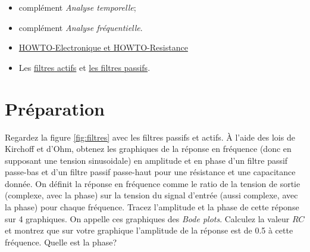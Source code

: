 \documentclass[canadien,12pt,oneside,letterpaper]{article}
\begin{document}
\begin{itemize}
\item complément \textit{Analyse temporelle};
\item complément \textit{Analyse fréquentielle}.
\item \href{https://github.com/dccote/Enseignement/blob/master/HOWTO/}{HOWTO-Electronique et HOWTO-Resistance} 
\item Les \href{https://www.electronics-tutorials.ws/filter/filter_5.html}{filtres actifs} et \href{https://www.electronics-tutorials.ws/filter/filter_6.html}{les filtres passifs}.
\end{itemize}





\section{Préparation}
Regardez la figure \ref{fig:filtres} avec les filtres passifs et actifs. À l'aide des lois de Kirchoff et d'Ohm, obtenez les graphiques de la réponse en fréquence (donc en supposant une tension sinusoidale) en amplitude et en phase d'un filtre passif passe-bas et d'un filtre passif passe-haut pour une résistance et une capacitance donnée.  On définit la réponse en fréquence comme le ratio de la tension de sortie (complexe, avec la phase) sur la tension du signal d'entrée (aussi complexe, avec la phase) pour chaque fréquence.  Tracez l'amplitude et la phase de cette réponse sur 4  graphiques. On appelle ces graphiques des {\em Bode plots}. Calculez la valeur $RC$ et montrez que sur votre graphique l'amplitude de la réponse est de 0.5 à cette fréquence.  Quelle est la phase?
\end{document}
